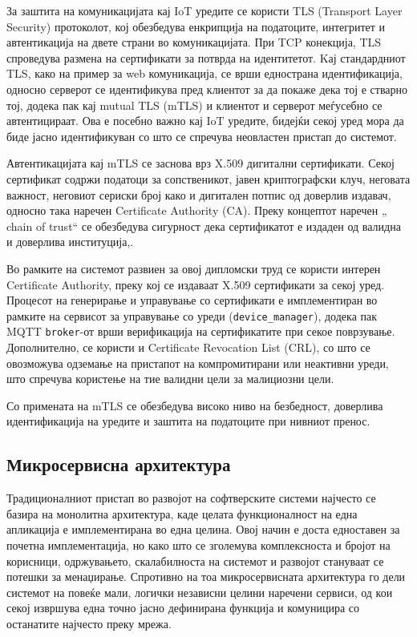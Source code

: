 За заштита на комуникацијата кај IoT уредите се користи TLS (Transport
Layer Security) протоколот, кој обезбедува енкрипција на податоците,
интегритет и автентикација на двете страни во комуникацијата. При TCP
конекција, TLS спроведува размена на сертификати за потврда на
идентитетот. Kај стандардниот TLS, како на пример за web комуникација,
се врши еднострана идентификација, односно серверот се идентификува пред
клиентот за да покаже дека тој е стварно тој, додека пак кај mutual TLS
(mTLS) и клиентот и серверот меѓусебно се автентицираат. Ова е посебно
важно кај IoT уредите, бидејќи секој уред мора да биде јасно
идентификуван со што се спречува неовластен пристап до системот.

Автентикацијата кај mTLS се заснова врз X.509 дигитални сертификати.
Секој сертификат содржи податоци за сопственикот, јавен криптографски
клуч, неговата важност, неговиот сериски број како и дигитален потпис од
доверлив издавач, односно така наречен Certificate Authority (CA). Преку
концептот наречен „ chain of trust`` се обезбедува сигурност дека
сертификатот е издаден од валидна и доверлива институција,.

Во рамките на системот развиен за овој дипломски труд се користи интерен
Certificate Authority, преку кој се издаваат X.509 сертификати за секој
уред. Процесот на генерирање и управување со сертификати е имплементиран
во рамките на сервисот за управување со уреди (\texttt{device\_manager}), додека
пак MQTT \texttt{broker}-от врши верификација на сертификатите при секое
поврзување. Дополнително, се користи и Certificate Revocation List
(CRL), со што се овозможува одземање на пристапот на компромитирани или
неактивни уреди, што спречува користење на тие валидни цели за
малициозни цели.

Со примената на mTLS се обезбедува високо ниво на безбедност, доверлива
идентификација на уредите и заштита на податоците при нивниот пренос.

\subsection{Микросервисна архитектура}

Традиционалниот пристап во развојот на софтверските системи најчесто се
базира на монолитна архитектура, каде целата функционалност на една
апликација е имплементирана во една целина. Овој начин е доста
едноставен за почетна имплементација, но како што се зголемува
комплексноста и бројот на корисници, одржувањето, скалабилноста на
системот и развојот стануваат се потешки за менаџирање. Спротивно на тоа
микросервисната архитектура го дели системот на повеќе мали, логички
независни целини наречени сервиси, од кои секој извршува една точно
јасно дефинирана функција и комуницира со останатите најчесто преку
мрежа.

